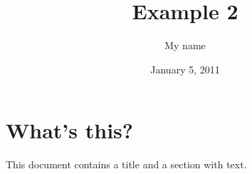 \documentclass[a4paper,11pt]{article}
\begin{document}
\title{Example 2}
\author{My name}
\date{January 5, 2011}
\maketitle
\section{What's this?}
This document contains a title and
a section with text.
\end{document}
